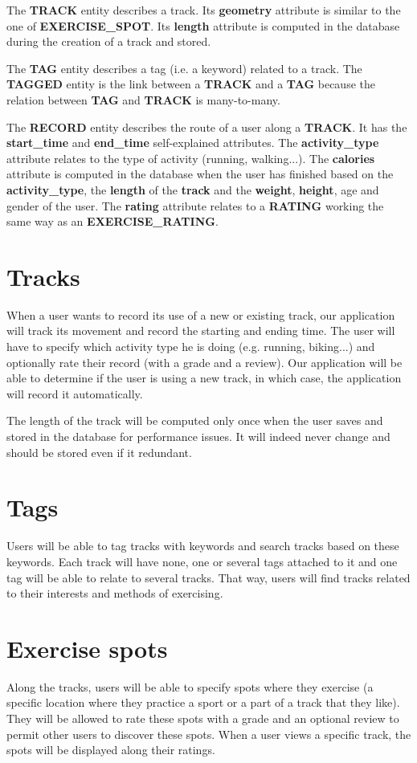 \documentclass[a4paper]{article}
\begin{document}
The \textbf{TRACK} entity describes a track. Its \textbf{geometry} attribute is similar to the one of \textbf{EXERCISE\_SPOT}. Its \textbf{length} attribute is computed in the database during the creation of a track and stored.

The \textbf{TAG} entity describes a tag (i.e. a keyword) related to a track. The \textbf{TAGGED} entity is the link between a \textbf{TRACK} and a \textbf{TAG} because the relation between \textbf{TAG} and \textbf{TRACK} is many-to-many.

The \textbf{RECORD} entity describes the route of a user along a \textbf{TRACK}. It has the \textbf{start\_time} and \textbf{end\_time} self-explained attributes. The \textbf{activity\_type} attribute relates to the type of activity (running, walking...). The \textbf{calories} attribute is computed in the database when the user has finished based on the \textbf{activity\_type}, the \textbf{length} of the \textbf{track} and the \textbf{weight}, \textbf{height}, age and gender of the user. The \textbf{rating} attribute relates to a \textbf{RATING} working the same way as an \textbf{EXERCISE\_RATING}.

\section{Tracks}

When a user wants to record its use of a new or existing track, our application will track its movement and record the starting and ending time. The user will have to specify which activity type he is doing (e.g. running, biking...) and optionally rate their record (with a grade and a review). Our application will be able to determine if the user is using a new track, in which case, the application will record it automatically.

The length of the track will be computed only once when the user saves and stored in the database for performance issues. It will indeed never change and should be stored even if it redundant.

\section{Tags}

Users will be able to tag tracks with keywords and search tracks based on these keywords. Each track will have none, one or several tags attached to it and one tag will be able to relate to several tracks. That way, users will find tracks related to their interests and methods of exercising.

\section{Exercise spots}

Along the tracks, users will be able to specify spots where they exercise (a specific location where they practice a sport or a part of a track that they like). They will be allowed to rate these spots with a grade and an optional review to permit other users to discover these spots.
When a user views a specific track, the spots will be displayed along their ratings.
\end{document}

